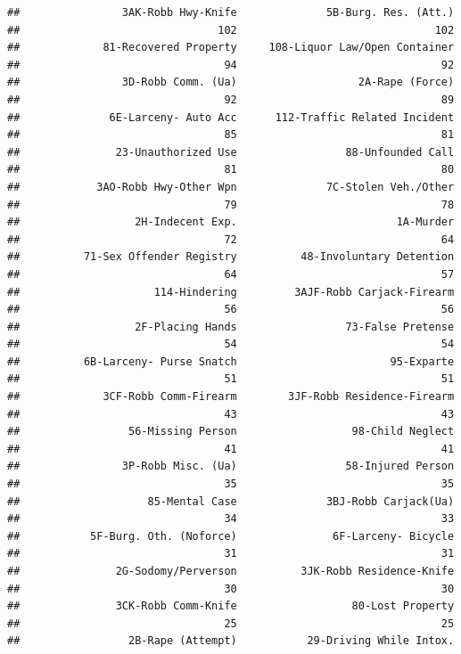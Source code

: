 \documentclass[]{article}
\theoremstyle{definition}
\theoremstyle{definition}
\theoremstyle{remark}
\begin{document}
\begin{verbatim}
##                3AK-Robb Hwy-Knife              5B-Burg. Res. (Att.) 
##                               102                               102 
##             81-Recovered Property     108-Liquor Law/Open Container 
##                                94                                92 
##                3D-Robb Comm. (Ua)                   2A-Rape (Force) 
##                                92                                89 
##              6E-Larceny- Auto Acc      112-Traffic Related Incident 
##                                85                                81 
##               23-Unauthorized Use                 88-Unfounded Call 
##                                81                                80 
##            3AO-Robb Hwy-Other Wpn              7C-Stolen Veh./Other 
##                                79                                78 
##                  2H-Indecent Exp.                         1A-Murder 
##                                72                                64 
##          71-Sex Offender Registry          48-Involuntary Detention 
##                                64                                57 
##                     114-Hindering         3AJF-Robb Carjack-Firearm 
##                                56                                56 
##                  2F-Placing Hands                 73-False Pretense 
##                                54                                54 
##          6B-Larceny- Purse Snatch                        95-Exparte 
##                                51                                51 
##             3CF-Robb Comm-Firearm        3JF-Robb Residence-Firearm 
##                                43                                43 
##                 56-Missing Person                  98-Child Neglect 
##                                41                                41 
##                3P-Robb Misc. (Ua)                 58-Injured Person 
##                                35                                35 
##                    85-Mental Case              3BJ-Robb Carjack(Ua) 
##                                34                                33 
##           5F-Burg. Oth. (Noforce)               6F-Larceny- Bicycle 
##                                31                                31 
##               2G-Sodomy/Perverson          3JK-Robb Residence-Knife 
##                                30                                30 
##               3CK-Robb Comm-Knife                  80-Lost Property 
##                                25                                25 
##                 2B-Rape (Attempt)           29-Driving While Intox. 

\end{verbatim}
\end{document}
